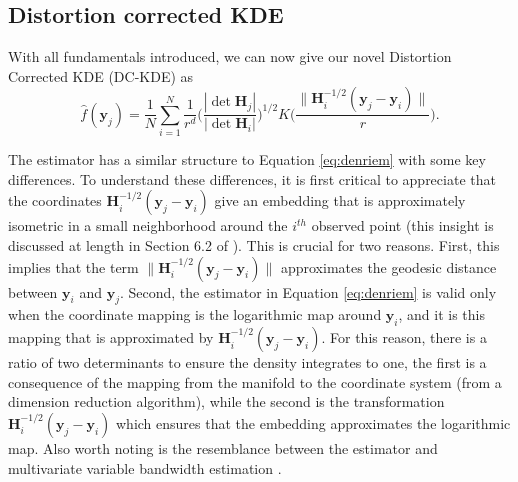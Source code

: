 \documentclass[12pt]{article}
\begin{document}
\hypertarget{DCKDE}{%
\subsection{Distortion corrected KDE}\label{DCKDE}}

With all fundamentals introduced, we can now give our novel Distortion Corrected KDE (DC-KDE) as
\begin{equation}
\label{eq:denestimator}
\hat{f}(\bm{y}_j) = \frac{1}{N} \sum_{i=1}^{N} \frac{1}{r^d} \bigg(\frac{|\det \bm{H}_j|}{|\det \bm{H}_i|} \bigg)^{1/2} K\bigg( \frac{\| \bm{H}^{-1/2}_i (\bm{y}_j - \bm{y}_i)\|}{r} \bigg).
\end{equation}

The estimator has a similar structure to Equation \eqref{eq:denriem} with some key differences. To understand these differences, it is first critical to appreciate that the coordinates \(\bm{H}^{-1/2}_i (\bm{y}_j - \bm{y}_i)\) give an embedding that is approximately isometric in a small neighborhood around the \(i^{th}\) observed point (this insight is discussed at length in Section 6.2 of \textcite{Perrault-Joncas2013-pq}). This is crucial for two reasons. First, this implies that the term \(\| \bm{H}^{-1/2}_i (\bm{y}_j - \bm{y}_i)\|\) approximates the geodesic distance between \(\bm{y}_i\) and \(\bm{y}_j\). Second, the estimator in Equation \eqref{eq:denriem} is valid only when the coordinate mapping is the logarithmic map around \(\bm{y}_i\), and it is this mapping that is approximated by \(\bm{H}^{-1/2}_i (\bm{y}_j - \bm{y}_i)\). For this reason, there is a ratio of two determinants to ensure the density integrates to one, the first is a consequence of the mapping from the manifold to the coordinate system (from a dimension reduction algorithm), while the second is the transformation \(\bm{H}^{-1/2}_i (\bm{y}_j - \bm{y}_i)\) which ensures that the embedding approximates the logarithmic map. Also worth noting is the resemblance between the estimator and multivariate variable bandwidth estimation \autocite{Breiman1977-qc,Jones1990-oe,Terrell1992-ut}.
\end{document}
